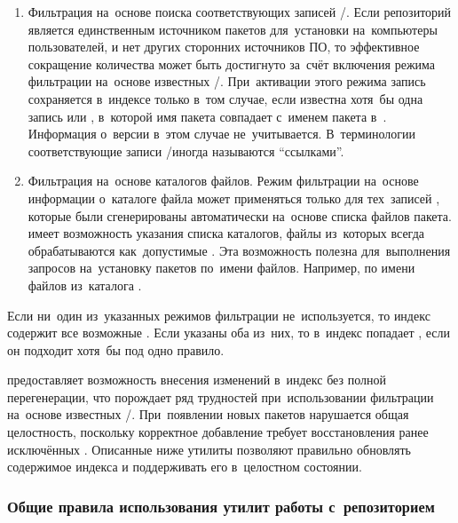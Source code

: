 \begin{enumerate}

\item{
Фильтрация на~основе поиска соответствующих записей \requires/\conflicts.
Если репозиторий является единственным источником пакетов для~установки на~компьютеры пользователей, 
и нет других сторонних источников ПО, 
то эффективное сокращение количества \provides может быть достигнуто за~счёт включения режима фильтрации на~основе известных \requires/\conflicts.
При~активации этого режима запись \provides сохраняется в~индексе только в~том случае, если известна хотя~бы одна запись \requires или \conflicts,
в~которой имя пакета совпадает с~именем пакета в~\provides. 
Информация о~версии в~этом случае не~учитывается.
В~терминологии \ds соответствующие записи \requires/\conflicts иногда называются ``ссылками''.
}

\item {
Фильтрация на~основе каталогов файлов.
Режим фильтрации \provides на~основе информации о~каталоге файла может применяться только для тех~записей \provides,
которые были сгенерированы автоматически на~основе списка файлов пакета.
\ds имеет возможность указания списка  каталогов, файлы из~которых всегда обрабатываются как~допустимые \provides.
Эта возможность полезна для~выполнения запросов на~установку пакетов по~имени файлов.
Например, по имени файлов из~каталога .
}

\end{enumerate}

Если ни~один из~указанных режимов фильтрации \provides не~используется, то индекс содержит все возможные \provides.
Если указаны оба из~них, то в~индекс попадает \provides, если он подходит хотя~бы под одно правило.

\ds предоставляет возможность внесения изменений в~индекс без полной перегенерации,
что порождает ряд трудностей при~использовании фильтрации \provides на~основе известных \requires/\conflicts.
При~появлении новых пакетов нарушается общая целостность,
поскольку корректное добавление требует восстановления ранее исключённых \provides.
Описанные ниже утилиты позволяют правильно обновлять содержимое индекса и поддерживать его в~целостном состоянии.

\subsubsection{Общие правила использования утилит работы с~репозиторием}

